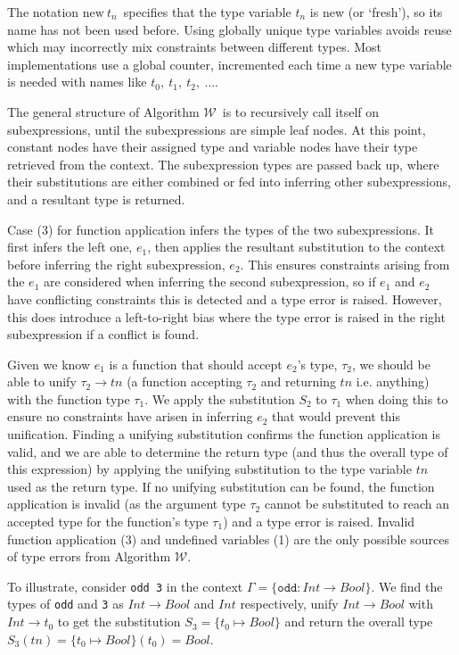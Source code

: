 \documentclass[a4paper,fleqn,oneside,12pt]{report}
\newcommand{\W}{$\mathcal{W}$}
\begin{document}
The notation $\textrm{new}\ t_n$\ specifies that the type variable $t_n$ is new (or `fresh'), so its name has not been used before. Using globally unique type variables avoids reuse which may incorrectly mix constraints between different types. Most implementations use a global counter, incremented each time a new type variable is needed with names like $t_0,\ t_1,\ t_2,\ \dots$.

The general structure of Algorithm \W\ is to recursively call itself on subexpressions, until the subexpressions are simple leaf nodes. At this point, constant nodes have their assigned type and variable nodes have their type retrieved from the context. The subexpression types are passed back up, where their substitutions are either combined or fed into inferring other subexpressions, and a resultant type is returned.

Case (3) for function application infers the types of the two subexpressions. It first infers the left one, $e_1$, then applies the resultant substitution to the context before inferring the right subexpression, $e_2$. This ensures constraints arising from the $e_1$ are considered when inferring the second subexpression, so if $e_1$ and $e_2$ have conflicting constraints this is detected and a type error is raised. However, this does introduce a left-to-right bias where the type error is raised in the right subexpression if a conflict is found.

Given we know $e_1$ is a function that should accept $e_2$'s type, $\tau_2$, we should be able to unify $\tau_2 \rightarrow tn$ (a function accepting $\tau_2$ and returning $tn$ i.e. anything) with the function type $\tau_1$. We apply the substitution $S_2$ to $\tau_1$ when doing this to ensure no constraints have arisen in inferring $e_2$ that would prevent this unification. Finding a unifying substitution confirms the function application is valid, and we are able to determine the return type (and thus the overall type of this expression) by applying the unifying substitution to the type variable $tn$ used as the return type. If no unifying substitution can be found, the function application is invalid (as the argument type $\tau_2$ cannot be substituted to reach an accepted type for the function’s type $\tau_1$) and a type error is raised. Invalid function application (3) and undefined variables (1) are the only possible sources of type errors from Algorithm \W.

To illustrate, consider \texttt{odd 3} in the context $\Gamma = \{ \mathtt{odd} : Int \rightarrow Bool \}$. We find the types of \texttt{odd} and \texttt{3} as $Int \rightarrow Bool$ and $Int$ respectively, unify $Int \rightarrow Bool$ with $Int \rightarrow t_0$ to get the substitution $S_3 = \{ t_0 \mapsto Bool \}$ and return the overall type $S_3(tn) = \{ t_0 \mapsto Bool \}(t_0) = Bool$.
\end{document}
